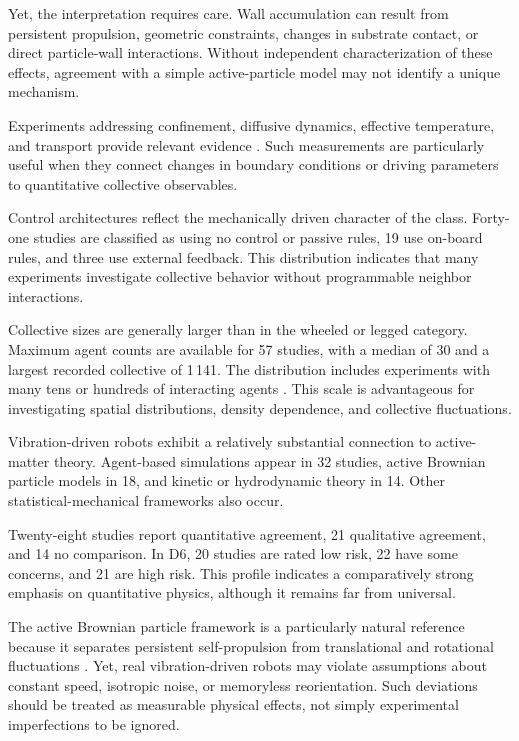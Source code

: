 Yet, the interpretation requires
care. Wall accumulation can result
from persistent propulsion,
geometric constraints, changes
in substrate contact, or direct
particle-wall interactions.
Without independent characterization
of these effects, agreement with
a simple active-particle model
may not identify a unique
mechanism.

Experiments addressing confinement,
diffusive dynamics, effective
temperature, and transport
provide relevant evidence
\cite{Deblais2018boundariescontrolc,Boudet2022effectivetemperatur,Engbring2023anonlinearfluctuat,Rozenblit2025trafficjamformatio,Musacchio2026fluidizationinduced,Wagner2026geometryinducedtra,Escobar2025effectofparticlec,VidalesHernndez2026onthemotionofsel}.
Such measurements are particularly
useful when they connect changes
in boundary conditions or driving
parameters to quantitative
collective observables.

Control architectures reflect
the mechanically driven character
of the class. Forty-one studies
are classified as using no control
or passive rules, 19 use on-board
rules, and three use external
feedback. This distribution
indicates that many experiments
investigate collective behavior
without programmable neighbor
interactions.

Collective sizes are generally
larger than in the wheeled
or legged category. Maximum
agent counts are available for
57 studies, with a median of
30 and a largest recorded
collective of 1\,141. The
distribution includes experiments
with many tens or hundreds
of interacting agents
\cite{Wang2025hyperuniformnetwork,Baconnier2022selectiveandcollec,Boudet2021fromcollectionsof,Zion2023morphologicalcomput,Giomi2013swarmingswirlinga}.
This scale is advantageous for
investigating spatial distributions,
density dependence, and collective
fluctuations.

Vibration-driven robots exhibit
a relatively substantial connection
to active-matter theory.
Agent-based simulations appear in
32 studies, active Brownian particle
models in 18, and kinetic or
hydrodynamic theory in 14.
Other statistical-mechanical
frameworks also occur.

Twenty-eight studies report
quantitative agreement, 21
qualitative agreement, and 14
no comparison. In D6,
20 studies are rated low risk,
22 have some concerns, and
21 are high risk. This profile
indicates a comparatively
strong emphasis on quantitative
physics, although it remains
far from universal.

The active Brownian particle
framework is a particularly
natural reference because it
separates persistent self-propulsion
from translational and rotational
fluctuations
\cite{Bechinger2016active}.
Yet, real vibration-driven
robots may violate assumptions
about constant speed, isotropic
noise, or memoryless reorientation.
Such deviations should be treated
as measurable physical effects,
not simply experimental imperfections
to be ignored.

